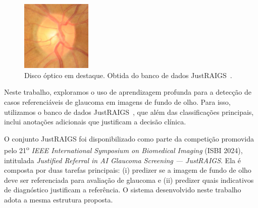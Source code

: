 \documentclass[12pt]{article}
\begin{document}
\begin{figure}[htb]
 \centering
 \includegraphics[width=0.3\textwidth]{images/disk.jpg}
 \caption{Disco óptico em destaque. Obtida do banco de dados JustRAIGS~\cite{justraigs}.}
 \label{fig:disk}
\end{figure}

Neste trabalho, exploramos o uso de aprendizagem profunda para a detecção de casos referenciáveis de glaucoma em imagens de fundo de olho. Para isso, utilizamos o banco de dados JustRAIGS~\cite{justraigs}, que além das classificações principais, inclui anotações adicionais que justificam a decisão clínica.



O conjunto JustRAIGS foi disponibilizado como parte da competição promovida pelo 21\textsuperscript{o} \textit{IEEE International Symposium on Biomedical Imaging} (ISBI 2024), intitulada \textit{Justified Referral in AI Glaucoma Screening --- JustRAIGS}. Ela é composta por duas tarefas principais: (i) predizer se a imagem de fundo de olho deve ser referenciada para avaliação de glaucoma e (ii) predizer quais indicativos de diagnóstico justificam a referência. O sistema desenvolvido neste trabalho adota a mesma estrutura proposta.
\end{document}
